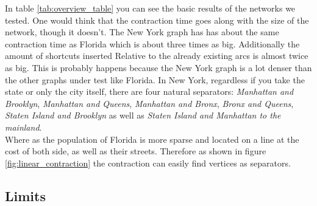 In table \ref{tab:overview_table} you can see the basic results of the networks we tested.
One would think that the contraction time goes along with the size of the network, though it doesn't.
The New York graph has has about the same contraction time as Florida which is about three times as big.
Additionally the amount of shortcuts inserted Relative to the already existing arcs is almost twice as big.
This is probably happens because the New York graph is a lot denser than the other graphs under test like Florida.
In New York, regardless if you take the state or only the city itself, there are four natural separators: \textit{Manhattan and Brooklyn}, \textit{Manhattan and Queens}, \textit{Manhattan and Bronx}, \textit{Bronx and Queens}, \textit{Staten Island and Brooklyn} as well as \textit{Staten Island and Manhattan to the mainland}.
\\ 
Where as the population of Florida is more sparse and located on a line at the cost of both side, as well as their streets.
Therefore as shown in figure \ref{fig:linear_contraction} the contraction can easily find vertices as separators.

\subsection{Limits} \label{sec:contraction_limits}

